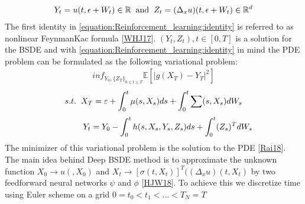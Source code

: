 \documentclass[letterpaper,10pt,english]{jupyterBook}
\begin{document}
\begin{equation}\label{equation:Reinforcement_learning:identity}
\begin{split}Y_t = u(t, \epsilon + W_t) \in \mathbb{R}  \hspace{0.2cm}\text{and}\hspace{0.2cm} Z_t = (\Delta_x u) (t, \epsilon + W_t) \in \mathbb{R}^d\end{split}
\end{equation}
\sphinxAtStartPar
The first identity in \eqref{equation:Reinforcement_learning:identity} is referred to as nonlinear Feynman\sphinxhyphen{}Kac formula {[}\hyperlink{cite.Discussion:id29}{WHJ17}{]}. \((Y_t, Z_t), t \in [0,T]\) is a solution for the BSDE and with \eqref{equation:Reinforcement_learning:identity} in mind the PDE problem can be formulated as the following variational problem:
\begin{equation*}
\begin{split} inf_{Y_0,\{Z_T\}_{0\leq t\leq T}} \mathbb{E}[|g(X_T) - Y_T|^2] \end{split}
\end{equation*}\begin{equation*}
\begin{split} s.t. \hspace{0.2cm}X_T = \varepsilon + \int_0^t \mu(s,X_s)ds + \int_0^t\sum(s,X_s)dW_s \end{split}
\end{equation*}\begin{equation*}
\begin{split}  \hspace{1.2cm}Y_t = Y_0 - \int_0^th(s,X_s,Y_s,Z_s)ds + \int_0^t(Z_s)^TdW_s\end{split}
\end{equation*}
\sphinxAtStartPar
The minimizer of this variational problem is the solution to the PDE {[}\hyperlink{cite.Discussion:id26}{Rai18}{]}. The main idea behind Deep BSDE method is to approximate the unknown function \(X_0 \rightarrow u(, X_0)\) and \(X_t \rightarrow [\sigma(t,X_t)]^T((\Delta_x u)(t,X_t)\) by two feedforward neural networks \(\psi\) and \(\phi\) {[}\hyperlink{cite.Discussion:id30}{HJW18}{]}. To achieve this we discretize time using Euler scheme on a grid \( 0 = t_0<t_1<...<T_N =T \)
\end{document}
